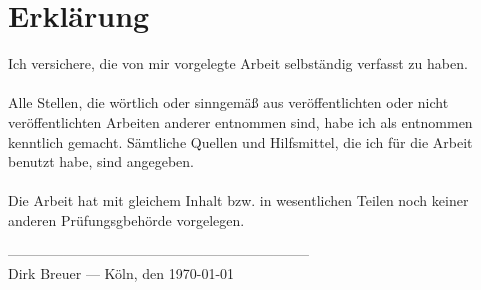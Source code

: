 
\chapter*{Erklärung}\label{chap:erklaerung}

Ich versichere, die von mir vorgelegte Arbeit selbständig verfasst zu haben.\\ \\
Alle Stellen, die wörtlich oder sinngemäß aus veröffentlichten oder nicht veröffentlichten Arbeiten anderer entnommen sind, habe ich als entnommen kenntlich gemacht. Sämtliche Quellen und Hilfsmittel, die ich für die Arbeit benutzt habe, sind angegeben.\\ \\
Die Arbeit hat mit gleichem Inhalt bzw. in wesentlichen Teilen noch keiner anderen Prüfungsgbehörde vorgelegen.

\vspace{4cm}

\begin{flushright}
  -----------------------------------------------------------------\\
  Dirk Breuer --- Köln, den \today
\end{flushright}
